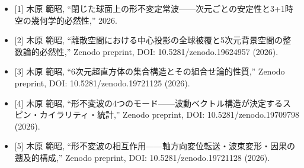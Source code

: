 \documentclass[
  a4paper,11pt]{ltjsarticle}
\providecommand{\tightlist}{%
  \setlength{\itemsep}{0pt}\setlength{\parskip}{0pt}}
\theoremstyle{definition}
\theoremstyle{remark}
\begin{document}
\begin{itemize}
\tightlist
\item
  {[}1{]} 木原 範昭,
  ``閉じた球面上の形不変定常波------次元ごとの安定性と3+1時空の幾何学的必然性,''
  2026.
\item
  {[}2{]} 木原 範昭,
  ``離散空間における中心投影の全球被覆と5次元背景空間の整数論的必然性,''
  Zenodo preprint, DOI: 10.5281/zenodo.19624957 (2026).
\item
  {[}3{]} 木原 範昭, ``6次元超直方体の集合構造とその組合せ論的性質,''
  Zenodo preprint, DOI: 10.5281/zenodo.19721125 (2026).
\item
  {[}4{]} 木原 範昭,
  ``形不変波の4つのモード------波動ベクトル構造が決定するスピン・カイラリティ・統計,''
  Zenodo preprint, DOI: 10.5281/zenodo.19709798 (2026).
\item
  {[}5{]} 木原 範昭,
  ``形不変波の相互作用------軸方向変位転送・波束変形・因果の遡及的構成,''
  Zenodo preprint, DOI: 10.5281/zenodo.19721128 (2026).
\end{itemize}
\end{document}
